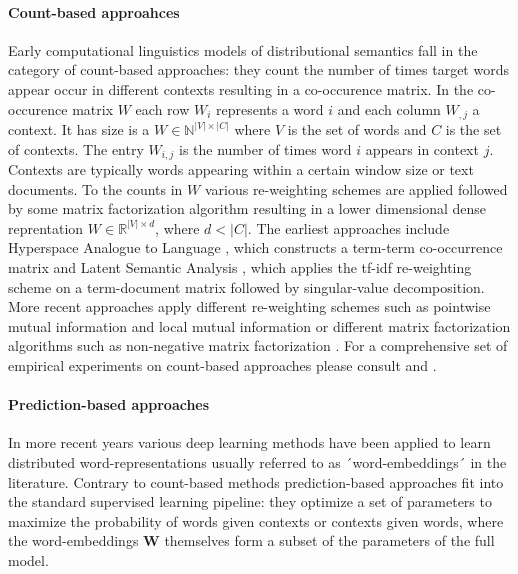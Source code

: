 \paragraph{Count-based approahces}
Early computational linguistics models of distributional semantics fall in the category of
count-based approaches: they count the number of times target words appear occur in different
contexts resulting in a co-occurence matrix. In the co-occurence matrix
$W$ each row $W_i$ represents a word $i$ and each column $W_{,j}$ a context. It has size
is a $W \in \mathbb{N}^{|V| \times |C|}$ where $V$ is the set of words and $C$ is
the set of contexts.
The entry $W_{i,j}$ is the number of times word $i$ appears in context $j$.
Contexts are typically words appearing within a certain window size or text documents.
To the counts in $W$ various re-weighting schemes are applied followed by some matrix factorization algorithm
resulting in a lower dimensional dense reprentation $W \in \mathbb{R}^{|V| \times d}$, where $d < |C|$.
The earliest approaches include Hyperspace Analogue to Language \cite{lund1996producing},
which constructs a term-term co-occurrence matrix and Latent Semantic Analysis \cite{dumais2004latent},
which applies the tf-idf re-weighting scheme on a term-document matrix followed by singular-value decomposition.
More recent approaches apply different re-weighting schemes such as pointwise mutual information and local mutual
information \cite{evert2005statistics} or different matrix factorization algorithms such as non-negative
matrix factorization \cite{baroni2014don}. For a comprehensive set of empirical experiments on count-based
approaches please consult \cite{bullinaria2007extracting} and \cite{bullinaria2012extracting}.

\paragraph{Prediction-based approaches}
In more recent years
various deep learning methods have been applied to learn distributed word-representations usually referred to
as ´word-embeddings´ in the literature. Contrary to count-based methods prediction-based approaches fit into the
standard supervised learning pipeline: they optimize a set of parameters to maximize the probability of words
given contexts or contexts given words, where the word-embeddings $\mathbf{W}$
themselves form a subset of the parameters of the full model.

